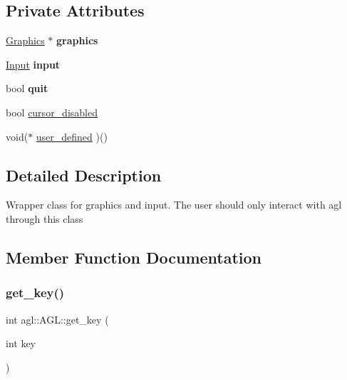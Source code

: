 \subsection*{Private Attributes}
\begin{DoxyCompactItemize}
\item 
\mbox{\label{classagl_1_1AGL_a0863a814cbcdaa8c551507f98b6e7ae4}} 
\mbox{\hyperlink{classagl_1_1Graphics}{Graphics}} $\ast$ {\bfseries graphics}
\item 
\mbox{\label{classagl_1_1AGL_ac8f8ce5d611f48153ab80c519afc80c9}} 
\mbox{\hyperlink{classagl_1_1Input}{Input}} {\bfseries input}
\item 
\mbox{\label{classagl_1_1AGL_ae8acb9f6a66b314297c2ed75678712d6}} 
bool {\bfseries quit}
\item 
bool \mbox{\hyperlink{classagl_1_1AGL_ad6593dbf0231be0fb3b5bdce34091e35}{cursor\+\_\+disabled}}
\item 
void($\ast$ \mbox{\hyperlink{classagl_1_1AGL_a99b802fbea79f60b87339212b7907633}{user\+\_\+defined}} )()
\end{DoxyCompactItemize}


\subsection{Detailed Description}
Wrapper class for graphics and input. The user should only interact with agl through this class 

\subsection{Member Function Documentation}
\mbox{\label{classagl_1_1AGL_a707632eae21db760f91ea745f951a8df}} 
\subsubsection{\texorpdfstring{get\_key()}{get\_key()}}
{\footnotesize\ttfamily int agl\+::\+A\+G\+L\+::get\+\_\+key (\begin{DoxyParamCaption}\item[{int}]{key }\end{DoxyParamCaption})}


